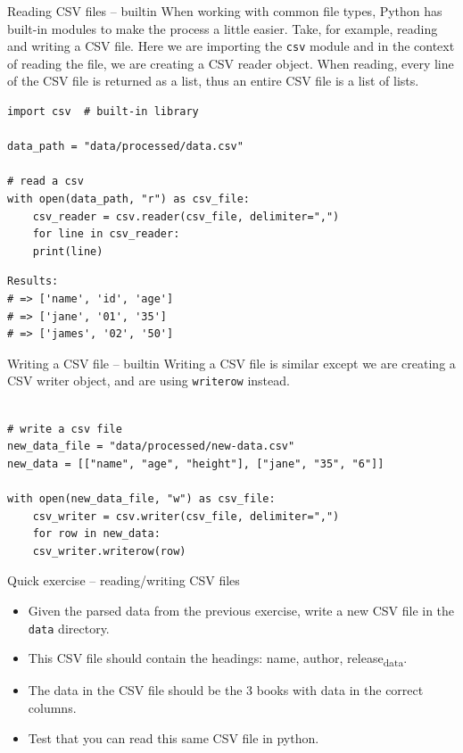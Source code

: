 \documentclass[10pt]{beamer}
\begin{document}
\begin{frame}[label={sec:org283a365},fragile]{Reading CSV files -- builtin}
 When working with common file types, Python has built-in modules to make the process
a little easier. Take, for example, reading and writing a CSV file. Here we are
importing the \texttt{csv} module and in the context of reading the file, we are creating a
CSV reader object. When reading, every line of the CSV file is returned as a list,
thus an entire CSV file is a list of lists.

\begin{verbatim}
import csv  # built-in library

data_path = "data/processed/data.csv"

# read a csv
with open(data_path, "r") as csv_file:
    csv_reader = csv.reader(csv_file, delimiter=",")
    for line in csv_reader:
	print(line)
\end{verbatim}

\begin{verbatim}
Results: 
# => ['name', 'id', 'age']
# => ['jane', '01', '35']
# => ['james', '02', '50']
\end{verbatim}
\end{frame}

\begin{frame}[label={sec:org9fabce8},fragile]{Writing a CSV file -- builtin}
 Writing a CSV file is similar except we are creating a CSV writer object, and are
using \texttt{writerow} instead.

\begin{verbatim}

# write a csv file
new_data_file = "data/processed/new-data.csv"
new_data = [["name", "age", "height"], ["jane", "35", "6"]]

with open(new_data_file, "w") as csv_file:
    csv_writer = csv.writer(csv_file, delimiter=",")
    for row in new_data:
	csv_writer.writerow(row)
\end{verbatim}
\end{frame}

\begin{frame}[label={sec:orgebd5f65},fragile]{Quick exercise -- reading/writing CSV files}
 \begin{itemize}
\item Given the parsed data from the previous exercise, write a new CSV file in the \texttt{data} directory.
\item This CSV file should contain the headings: name, author, release\textsubscript{data}.
\item The data in the CSV file should be the 3 books with data in the correct columns.
\item Test that you can read this same CSV file in python.
\end{itemize}
\end{frame}
\end{document}

